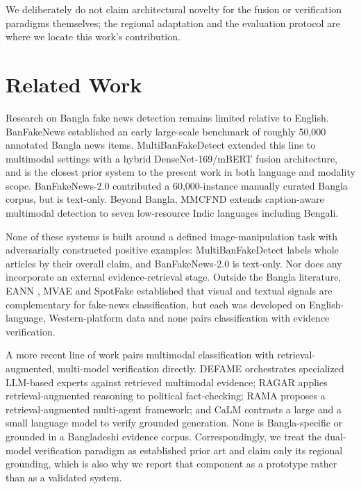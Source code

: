 \documentclass[conference,a4paper]{IEEEtran}
\begin{document}
We deliberately do not claim architectural novelty for the fusion or
verification paradigms themselves; the regional adaptation and the evaluation
protocol are where we locate this work's contribution.

\section{Related Work}

Research on Bangla fake news detection remains limited relative to English.
BanFakeNews \cite{banfakenews} established an early large-scale benchmark of
roughly 50{,}000 annotated Bangla news items. MultiBanFakeDetect
\cite{multibanfake} extended this line to multimodal settings with a hybrid
DenseNet-169/mBERT fusion architecture, and is the closest prior system to the
present work in both language and modality scope. BanFakeNews-2.0
\cite{banfakenews2} contributed a 60{,}000-instance manually curated Bangla
corpus, but is text-only. Beyond Bangla, MMCFND \cite{mmcfnd} extends
caption-aware multimodal detection to seven low-resource Indic languages
including Bengali.

None of these systems is built around a defined image-manipulation task with
adversarially constructed positive examples: MultiBanFakeDetect labels whole
articles by their overall claim, and BanFakeNews-2.0 is text-only. Nor does
any incorporate an external evidence-retrieval stage. Outside the Bangla
literature, EANN \cite{eann}, MVAE \cite{mvae} and SpotFake \cite{spotfake}
established that visual and textual signals are complementary for fake-news
classification, but each was developed on English-language, Western-platform
data and none pairs classification with evidence verification.

A more recent line of work pairs multimodal classification with
retrieval-augmented, multi-model verification directly. DEFAME \cite{defame}
orchestrates specialized LLM-based experts against retrieved multimodal
evidence; RAGAR \cite{ragar} applies retrieval-augmented reasoning to political
fact-checking; RAMA \cite{rama} proposes a retrieval-augmented multi-agent
framework; and CaLM \cite{calm} contrasts a large and a small language model to
verify grounded generation. None is Bangla-specific or grounded in a
Bangladeshi evidence corpus. Correspondingly, we treat the dual-model
verification paradigm as established prior art and claim only its regional
grounding, which is also why we report that component as a prototype rather
than as a validated system.
\end{document}
